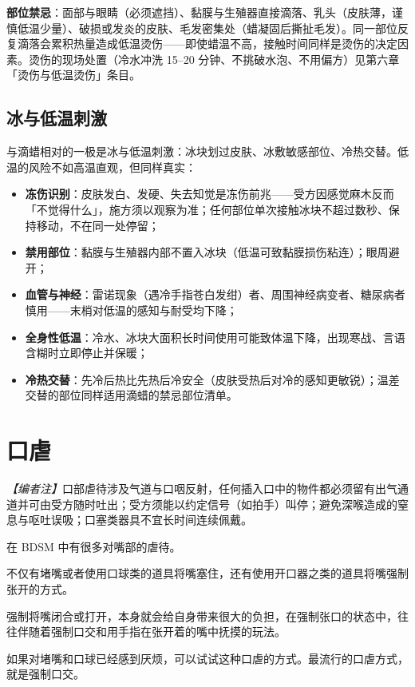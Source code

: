 \documentclass[12pt,UTF8]{ctexbook}
\begin{document}
\noindent\textbf{部位禁忌}：面部与眼睛（必须遮挡）、黏膜与生殖器直接滴落、乳头（皮肤薄，谨慎低温少量）、破损或发炎的皮肤、毛发密集处（蜡凝固后撕扯毛发）。同一部位反复滴落会累积热量造成低温烫伤——即使蜡温不高，接触时间同样是烫伤的决定因素。烫伤的现场处置（冷水冲洗 15--20 分钟、不挑破水泡、不用偏方）见第六章「烫伤与低温烫伤」条目。

\subsection{冰与低温刺激}

与滴蜡相对的一极是冰与低温刺激：冰块划过皮肤、冰敷敏感部位、冷热交替。低温的风险不如高温直观，但同样真实：

\begin{itemize}
\item \textbf{冻伤识别}：皮肤发白、发硬、失去知觉是冻伤前兆——受方因感觉麻木反而「不觉得什么」，施方须以观察为准；任何部位单次接触冰块不超过数秒、保持移动，不在同一处停留；
\item \textbf{禁用部位}：黏膜与生殖器内部不置入冰块（低温可致黏膜损伤粘连）；眼周避开；
\item \textbf{血管与神经}：雷诺现象（遇冷手指苍白发绀）者、周围神经病变者、糖尿病者慎用——末梢对低温的感知与耐受均下降；
\item \textbf{全身性低温}：冷水、冰块大面积长时间使用可能致体温下降，出现寒战、言语含糊时立即停止并保暖；
\item \textbf{冷热交替}：先冷后热比先热后冷安全（皮肤受热后对冷的感知更敏锐）；温差交替的部位同样适用滴蜡的禁忌部位清单。
\end{itemize}

\section{口虐}

\noindent\textit{【编者注】}口部虐待涉及气道与口咽反射，任何插入口中的物件都必须留有出气通道并可由受方随时吐出；受方须能以约定信号（如拍手）叫停；避免深喉造成的窒息与呕吐误吸；口塞类器具不宜长时间连续佩戴。

在 BDSM 中有很多对嘴部的虐待。

不仅有堵嘴或者使用口球类的道具将嘴塞住，还有使用开口器之类的道具将嘴强制张开的方式。

强制将嘴闭合或打开，本身就会给自身带来很大的负担，在强制张口的状态中，往往伴随着强制口交和用手指在张开着的嘴中抚摸的玩法。

如果对堵嘴和口球已经感到厌烦，可以试试这种口虐的方式。最流行的口虐方式，就是强制口交。
\end{document}
